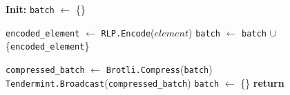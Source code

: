 \begin{figure}[t!]
  \begin{adjustbox}{minipage=[t]{\columnwidth}}
    \begin{algorithm}[H]
      \renewcommand{\thealgorithm}{Compress Collector}         
      \caption{}%
      \label{alg:collector-brotli}%
      \small
      \begin{algorithmic}[1]
            \State \textbf{Init:} \texttt{batch} $\leftarrow$ \{\}
      
            \label{alg:brotli_add_tx}
            			\State \texttt{encoded\_element} $\leftarrow$ \texttt{RLP.Encode}($element$)
					        \State \texttt{batch} $\leftarrow$ \texttt{batch} $\cup$ \{\texttt{encoded\_element}\}
                \EndIf

             			\State \texttt{compressed\_batch} $\leftarrow$  \texttt{Brotli.Compress}(\texttt{batch})
                	\State \texttt{Tendermint.Broadcast}(\texttt{compressed\_batch})
                  \State \texttt{batch} $\leftarrow$ \{\}
             	  \EndIf	
                \State \textbf{return}
            \EndFunction
            
        \end{algorithmic}
      \end{algorithm}
	\end{adjustbox}
  \end{figure}

